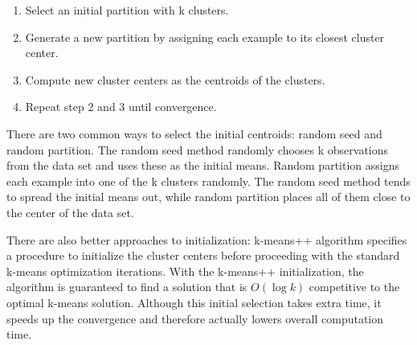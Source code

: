 \documentclass[conference]{IEEEtran}
\begin{document}
\begin{enumerate}
    \item Select an initial partition with k clusters.
    \item Generate a new partition by assigning each example to its closest cluster center.
    \item Compute new cluster centers as the centroids of the clusters.
    \item Repeat step 2 and 3 until convergence.
\end{enumerate}


There are two common ways to select the initial centroids: random seed and random partition.
The random seed method randomly chooses k observations from the data set
and uses these as the initial means. Random partition
assigns each example into one of the k clusters randomly.
The random seed method tends to spread the initial means out, while random partition
places all of them close to the center of the data set.

There are also better approaches to initialization: k-means++ algorithm specifies a
procedure to initialize the cluster centers before proceeding with the standard k-means
optimization iterations. With the k-means++ initialization, the algorithm is guaranteed
to find a solution that is $O(\log k)$ competitive to the optimal k-means solution.
Although this initial selection takes extra time, it speeds up the convergence and 
therefore actually lowers overall computation time.
\end{document}

